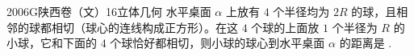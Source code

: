 
\begin{problem}{2006}{G}{陕西卷（文）}{16}{立体几何}
水平桌面 $ \alpha $ 上放有 $ 4 $ 个半径均为 $ 2R $ 的球，且相邻的球都相切（球心的连线构成正方形）。在这 $ 4 $ 个球的上面放 $ 1 $ 个半径为 $ R $ 的小球，它和下面的 $ 4 $ 个球恰好都相切，则小球的球心到水平桌面 $ \alpha $ 的距离是 \underline{\hspace{4em}}.
\end{problem}

\begin{answer}

\end{answer}

\begin{solutions}

\end{solutions}